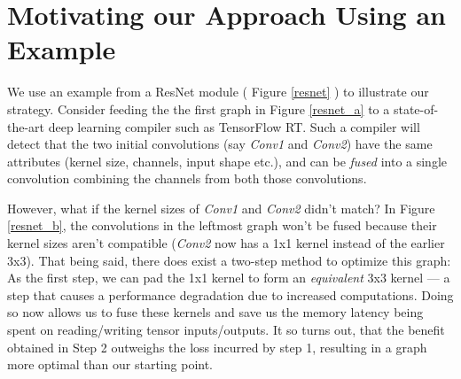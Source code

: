 \documentclass[12pt,a4paper,twoside,openright,bibliography=totocnumbered]{report}
\begin{document}
\section{Motivating our Approach Using an Example}
We use an example from a ResNet \cite{he2016} module ( Figure \ref{resnet} ) to illustrate our strategy. Consider feeding the the first graph in Figure \ref{resnet_a} to a state-of-the-art deep learning compiler such as TensorFlow RT. Such a compiler will detect that the two initial convolutions (say \textit{Conv1} and \textit{Conv2}) have the same attributes (kernel size, channels, input shape etc.), and can be \textit{fused} into a single convolution combining the channels from both those convolutions. 

However, what if the kernel sizes of \textit{Conv1} and \textit{Conv2} didn't match? In Figure \ref{resnet_b}, the convolutions in the leftmost graph won't be fused because their kernel sizes aren't compatible (\textit{Conv2} now has a 1x1 kernel instead of the earlier 3x3). That being said, there does exist a two-step method to optimize this graph: As the first step, we can pad the 1x1 kernel to form an \textit{equivalent} 3x3 kernel --- a step that causes a performance degradation due to increased computations. Doing so now allows us to fuse these kernels and save us the memory latency being spent on reading/writing tensor inputs/outputs. It so turns out, that the benefit obtained in Step 2 outweighs the loss incurred by step 1, resulting in a graph more optimal than our starting point.
\end{document}
